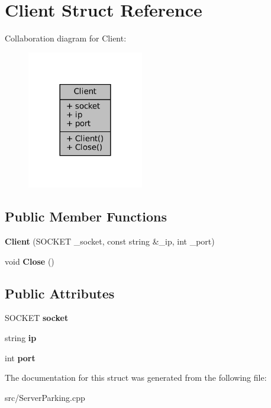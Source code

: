 \hypertarget{struct_client}{}\section{Client Struct Reference}
\label{struct_client}


Collaboration diagram for Client\+:
\nopagebreak
\begin{figure}[H]
\begin{center}
\leavevmode
\includegraphics[width=144pt]{struct_client__coll__graph}
\end{center}
\end{figure}
\subsection*{Public Member Functions}
\begin{DoxyCompactItemize}
\item 
\mbox{\label{struct_client_a132974d9849fc9318782f74ac6d67ecd}} 
{\bfseries Client} (S\+O\+C\+K\+ET \+\_\+socket, const string \&\+\_\+ip, int \+\_\+port)
\item 
\mbox{\label{struct_client_aaf6a8239f1f36ef898d289860d7dacb3}} 
void {\bfseries Close} ()
\end{DoxyCompactItemize}
\subsection*{Public Attributes}
\begin{DoxyCompactItemize}
\item 
\mbox{\label{struct_client_aab1eb9aade8a3ebb53555a1934f71936}} 
S\+O\+C\+K\+ET {\bfseries socket}
\item 
\mbox{\label{struct_client_a5eaf1ed83e42eec32c685efc35c93e24}} 
string {\bfseries ip}
\item 
\mbox{\label{struct_client_aad8864d1362eae7c50e53c0d131b7442}} 
int {\bfseries port}
\end{DoxyCompactItemize}


The documentation for this struct was generated from the following file\+:\begin{DoxyCompactItemize}
\item 
src/Server\+Parking.\+cpp\end{DoxyCompactItemize}
